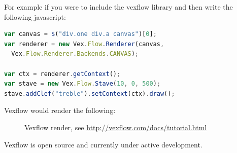 For example if you were to include the vexflow library and then write the following javascript:

\begin{lstlisting}[language=JavaScript]
var canvas = $("div.one div.a canvas")[0];
var renderer = new Vex.Flow.Renderer(canvas,
  Vex.Flow.Renderer.Backends.CANVAS);

var ctx = renderer.getContext();
var stave = new Vex.Flow.Stave(10, 0, 500);
stave.addClef("treble").setContext(ctx).draw();
\end{lstlisting}

Vexflow would render the following:


\begin{figure}[h!]
  \centering
  \caption{Vexflow render, see \url{http://vexflow.com/docs/tutorial.html}}
  \label{fig:VexflowOutput}
\end{figure}

Vexflow is open source and currently under active development.

